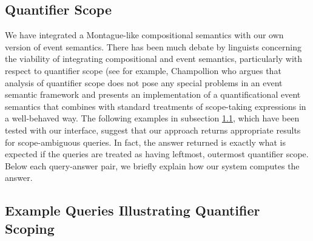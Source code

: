 \documentclass[../main.tex]{subfiles}
\begin{document}
\begin{refsection}
\section{Quantifier Scope}
\label{ext:quantifierscope}

We have integrated a Montague-like \cite{Dowty:wall} compositional semantics with our own
version of event semantics. There has been much debate by linguists concerning the viability of integrating
compositional and event semantics, particularly with respect to quantifier scope (see for example, Champollion
\cite{champollion2015interaction} who argues that analysis of quantifier scope does not pose any special problems in
an event semantic framework and presents an implementation of a quantificational event semantics that
combines with standard treatments of scope-taking expressions in a well-behaved way.
The following examples in subsection \ref{ext:examplequeries}, which have been tested with our interface, suggest that our approach
returns appropriate results for scope-ambiguous queries. In fact, the answer returned is exactly what is
expected if the queries are treated as having leftmost, outermost quantifier scope. Below each query-answer pair, we briefly explain how our system computes the answer.

\subsection{Example Queries Illustrating Quantifier Scoping}
\label{ext:examplequeries}


\end{refsection}
\end{document}
